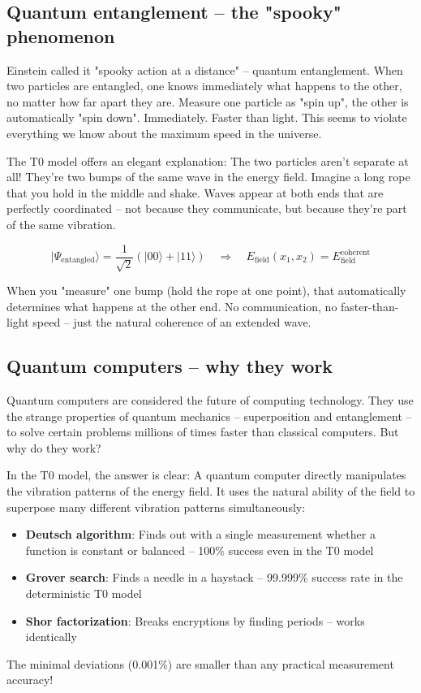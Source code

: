 \documentclass[12pt,a4paper]{article}
\newcommand{\Efield}{E_\text{field}}
\begin{document}
	\subsection{Quantum entanglement -- the "spooky" phenomenon}
	
	Einstein called it "spooky action at a distance" -- quantum entanglement. When two particles are entangled, one knows immediately what happens to the other, no matter how far apart they are. Measure one particle as "spin up", the other is automatically "spin down". Immediately. Faster than light. This seems to violate everything we know about the maximum speed in the universe.
	
	The T0 model offers an elegant explanation: The two particles aren't separate at all! They're two bumps of the same wave in the energy field. Imagine a long rope that you hold in the middle and shake. Waves appear at both ends that are perfectly coordinated -- not because they communicate, but because they're part of the same vibration.
	
	\begin{equation}
		|\Psi_{\text{entangled}}\rangle = \frac{1}{\sqrt{2}}(|00\rangle + |11\rangle) \quad \Rightarrow \quad \Efield(x_1, x_2) = \Efield^{\text{coherent}}
	\end{equation}
	
	When you "measure" one bump (hold the rope at one point), that automatically determines what happens at the other end. No communication, no faster-than-light speed -- just the natural coherence of an extended wave.
	
	\subsection{Quantum computers -- why they work}
	
	Quantum computers are considered the future of computing technology. They use the strange properties of quantum mechanics -- superposition and entanglement -- to solve certain problems millions of times faster than classical computers. But why do they work?
	
	\begin{experimental}
		In the T0 model, the answer is clear: A quantum computer directly manipulates the vibration patterns of the energy field. It uses the natural ability of the field to superpose many different vibration patterns simultaneously:
		
		\begin{itemize}
			\item \textbf{Deutsch algorithm}: Finds out with a single measurement whether a function is constant or balanced -- 100\% success even in the T0 model
			\item \textbf{Grover search}: Finds a needle in a haystack -- 99.999\% success rate in the deterministic T0 model
			\item \textbf{Shor factorization}: Breaks encryptions by finding periods -- works identically
		\end{itemize}
		
		The minimal deviations (0.001\%) are smaller than any practical measurement accuracy!
	\end{experimental}
	
\end{document}
